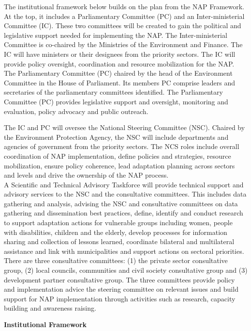 \documentclass[
]{book}
\begin{document}
The institutional framework below builds on the plan from the NAP Framework. At the top, it includes a Parliamentary Committee (PC) and an Inter-ministerial Committee (IC). These two committees will be created to gain the political and legislative support needed for implementing the NAP. The Inter-ministerial Committee is co-chaired by the Ministries of the Environment and Finance. The IC will have ministers or their designees from the priority sectors. The IC will provide policy oversight, coordination and resource mobilization for the NAP. The Parliamentary Committee (PC) chaired by the head of the Environment Committee in the House of Parliament. Its members PC comprise leaders and secretaries of the parliamentary committees identified. The Parliamentary Committee (PC) provides legislative support and oversight, monitoring and evaluation, policy advocacy and public outreach.

The IC and PC will oversee the National Steering Committee (NSC). Chaired by the Environment Protection Agency, the NSC will include departments and agencies of government from the priority sectors. The NCS roles include overall coordination of NAP implementation, define policies and strategies, resource mobilization, ensure policy coherence, lead adaptation planning across sectors and levels and drive the ownership of the NAP process.\\
A Scientific and Technical Advisory Taskforce will provide technical support and advisory services to the NSC and the consultative committees. This includes data gathering and analysis, advising the NSC and consultative committees on data gathering and dissemination best practices, define, identify and conduct research to support adaptation actions for vulnerable groups including women, people with disabilities, children and the elderly, develop processes for information sharing and collection of lessons learned, coordinate bilateral and multilateral assistance and link with municipalities and support actions on sectoral priorities.
There are three consultative committees: (1) the private sector consultative group, (2) local councils, communities and civil society consultative group and (3) development partner consultative group. The three committees provide policy and implementation advice the steering committee on relevant issues and build support for NAP implementation through activities such as research, capacity building and awareness raising.

\textbf{Institutional Framework}
\end{document}
